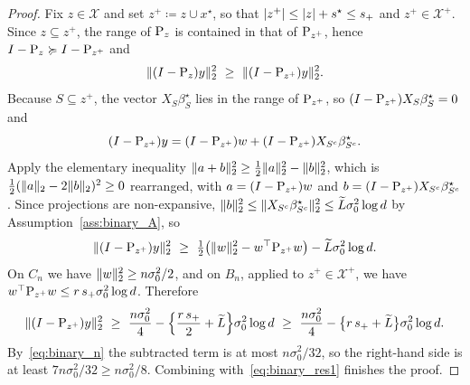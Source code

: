 \documentclass[aos]{imsart}%
\DeclarePairedDelimiter{\norm}{\lVert}{\rVert}
\DeclarePairedDelimiter{\abs}{\lvert}{\rvert}
\newcommand{\ambientspace}[0]{\mathcal{X}}
\theoremstyle{plain}
\theoremstyle{definition}
\begin{document}
    \begin{proof}
        Fix $z\in\ambientspace$ and set $z^{+}\coloneq z\cup x^{\star}$, so that
        $\abs{z^{+}}\leq\abs z+s^{\star}\leq s_+$ and
        $z^{+}\in\ambientspace^{+}$. Since
        $z\subseteq z^{+}$, the range of $\mathrm{P}_z$ is contained in that of
        $\mathrm{P}_{z^{+}}$, hence $I-\mathrm{P}_z\succcurlyeq I-\mathrm{P}_{z^{+}}$ and
        \begin{equation}
            \label{eq:binary_res1}
            \norm{(I-\Proj_z)y}_2^{2}\ \geq\ \norm{(I-\Proj_{z^{+}})y}_2^{2}.
        \end{equation}
        Because $S\subseteq z^{+}$, the vector $X_S\beta^\star_S$ lies in the
        range of $\mathrm{P}_{z^{+}}$, so $(I-\mathrm{P}_{z^{+}})X_S\beta^\star_S=0$ and
        \begin{equation*}
            (I-\mathrm{P}_{z^{+}})y
            =(I-\mathrm{P}_{z^{+}})w+(I-\mathrm{P}_{z^{+}})X_{S^{c}}\beta^\star_{S^{c}} .
        \end{equation*}
        Apply the elementary inequality
        $\norm{a+b}_2^{2}\geq\tfrac12\norm a_2^{2}-\norm b_2^{2}$, which is
        $\tfrac12(\norm a_2-2\norm b_2)^{2}\geq0$ rearranged, with
        $a=(I-\mathrm{P}_{z^{+}})w$ and $b=(I-\mathrm{P}_{z^{+}})X_{S^{c}}
        \beta^\star_{S^{c}}$. Since projections are non-expansive,
        $\norm b_2^{2}\leq\norm{X_{S^{c}}\beta^\star_{S^{c}}}_2^{2}
        \leq\Ltil\sigma_0^{2}\log d$ by Assumption~\ref{ass:binary_A}, so
        \begin{equation*}
            \norm{(I-\Proj_{z^{+}})y}_2^{2}
            \ \geq\ \tfrac12\bigl(\norm w_2^{2}-w^{\top}\Proj_{z^{+}}w\bigr)
            -\Ltil\sigma_0^{2}\log d .
        \end{equation*}
        On $C_n$ we have $\norm w_2^{2}\geq n\sigma_0^{2}/2$, and on $B_n$,
        applied to $z^{+}\in\ambientspace^{+}$, we have
        $w^{\top}\mathrm{P}_{z^{+}}w\leq r\,s_+\sigma_0^{2}\log d$. Therefore
        \begin{equation*}
            \norm{(I-\Proj_{z^{+}})y}_2^{2}
            \ \geq\ \frac{n\sigma_0^{2}}{4}
            -\Bigl\{\frac{r\,s_+}{2}+\Ltil\Bigr\}\sigma_0^{2}\log d
            \ \geq\ \frac{n\sigma_0^{2}}{4}
            -\bigl\{r\,s_++\Ltil\bigr\}\sigma_0^{2}\log d .
        \end{equation*}
        By~\eqref{eq:binary_n} the subtracted term is at most
        $n\sigma_0^{2}/32$, so the right-hand side is at least
        $7n\sigma_0^{2}/32\geq n\sigma_0^{2}/8$. Combining
        with~\eqref{eq:binary_res1} finishes the proof.
    \end{proof}
\end{document}
